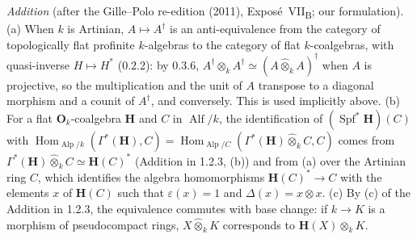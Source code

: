 \medskip\noindent
\emph{Addition} (after the Gille--Polo re-edition (2011), Expos\'e~VII\textsubscript{B}; our formulation).
(a) When \(k\) is Artinian, \(A\mapsto A^\dagger\) is an anti-equivalence from the category of
topologically flat profinite \(k\)-algebras to the category of flat \(k\)-coalgebras, with quasi-inverse
\(H\mapsto H^*\) (0.2.2): by 0.3.6, \(A^\dagger\otimes_kA^\dagger\simeq(A\widehat\otimes_kA)^\dagger\) when
\(A\) is projective, so the multiplication and the unit of \(A\) transpose to a diagonal morphism and a
counit of \(A^\dagger\), and conversely. This is used implicitly above. (b) For a flat
\(\mathbf O_k\)-coalgebra \(\mathbf H\) and \(C\) in \(\operatorname{Alf}/k\), the identification of
\((\operatorname{Spf}^*\mathbf H)(C)\) with
\(\operatorname{Hom}_{\operatorname{Alp}/k}(\Gamma^*(\mathbf H),C)
=\operatorname{Hom}_{\operatorname{Alp}/C}(\Gamma^*(\mathbf H)\widehat\otimes_kC,C)\) comes from
\(\Gamma^*(\mathbf H)\widehat\otimes_kC\simeq\mathbf H(C)^*\) (Addition in 1.2.3, (b)) and from (a) over the
Artinian ring \(C\), which identifies the algebra homomorphisms \(\mathbf H(C)^*\to C\) with the elements
\(x\) of \(\mathbf H(C)\) such that \(\varepsilon(x)=1\) and \(\Delta(x)=x\otimes x\). (c) By (c) of the
Addition in 1.2.3, the equivalence commutes with base change: if \(k\to K\) is a morphism of pseudocompact
rings, \(X\widehat\otimes_kK\) corresponds to \(\mathbf H(X)\otimes_kK\).
